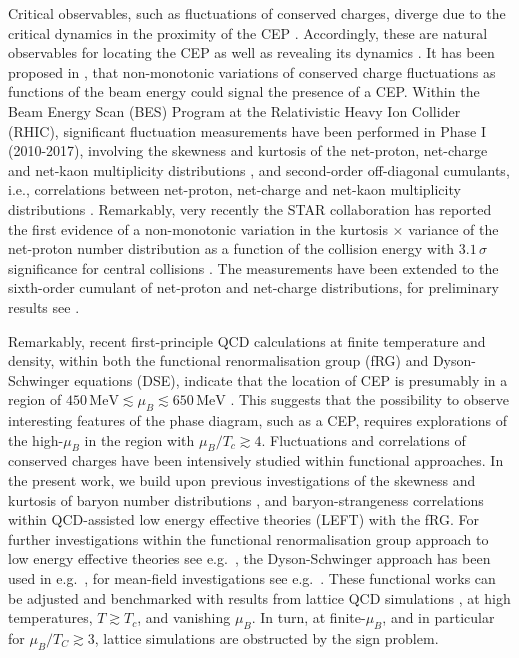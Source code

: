 \documentclass[%
reprint,
superscriptaddress,
showpacs,preprintnumbers,
amsmath,amssymb,
aps,
prd,
]{revtex4-1}
\begin{document}
Critical observables, such as fluctuations of conserved charges, diverge due to the critical dynamics in the proximity of the CEP \cite{Stephanov:2008qz}. Accordingly, these are natural observables for locating the CEP  as well as revealing its dynamics \cite{Luo:2017faz,Adam:2020unf}. It has been proposed in \cite{Stephanov:1999zu, Stephanov:2008qz, Stephanov:2011pb}, that non-monotonic variations of conserved charge fluctuations as functions of the beam energy could signal the presence of a CEP. Within the Beam Energy Scan (BES) Program at the Relativistic Heavy Ion Collider (RHIC), significant fluctuation measurements have been performed in Phase I (2010-2017), involving the skewness and kurtosis of the net-proton, net-charge and net-kaon multiplicity distributions  \cite{Adamczyk:2013dal,Adamczyk:2014fia,Luo:2015ewa,Adamczyk:2017wsl}, and second-order off-diagonal cumulants, i.e.,  correlations between net-proton, net-charge and net-kaon multiplicity distributions \cite{Adam:2019xmk}. Remarkably, very recently the STAR collaboration has reported the first evidence of a non-monotonic variation in the kurtosis $\times$ variance of the net-proton number distribution as a function of the collision energy with $3.1\,\sigma$ significance for central collisions \cite{Adam:2020unf}. The measurements have been extended to the sixth-order cumulant of net-proton and net-charge distributions, for preliminary results see  \cite{Nonaka:2020crv,Pandav:2020uzx}.
	
Remarkably, recent first-principle QCD calculations at finite temperature and density, within both the functional renormalisation group (fRG) and Dyson-Schwinger equations (DSE), indicate that the location of CEP is presumably in a region of $450\,\mathrm{MeV} \lesssim\mu_B\lesssim 650\,\mathrm{MeV}$ \cite{Fischer:2018sdj, Fu:2019hdw, Isserstedt:2019pgx, Gao:2020qsj, Gao:2020fbl}. This suggests that the possibility to observe interesting features of the phase diagram, such as a CEP, requires explorations of the high-$\mu_B$ in the region with $\mu_B/T_c\gtrsim 4$. Fluctuations and correlations of conserved charges have been intensively studied within functional approaches. In the present work, we build upon previous investigations  of the skewness and kurtosis of baryon number distributions \cite{Fu:2015naa, Fu:2015amv, Fu:2016tey}, and baryon-strangeness correlations \cite{Fu:2018qsk, Fu:2018swz} within QCD-assisted low energy effective theories (LEFT) with the fRG. For further  investigations within the functional renormalisation group approach to low energy effective theories see e.g.\  \cite{Skokov:2010wb, Skokov:2010uh, Morita:2014fda, Almasi:2017bhq}, the Dyson-Schwinger approach has been used in e.g.\  \cite{Xin:2014ela, Isserstedt:2019pgx}, for mean-field investigations see e.g.\ \cite{Fu:2009wy, Fu:2010ay, Karsch:2010hm, Schaefer:2011ex, Li:2018ygx}. These functional works can be adjusted and benchmarked with results from lattice QCD simulations  \cite{Bazavov:2012vg, Borsanyi:2013hza, Borsanyi:2014ewa, Bazavov:2017dus, Bazavov:2017tot, Borsanyi:2018grb, Bazavov:2020bjn}, at high temperatures, $T\gtrsim T_c$, and vanishing $\mu_B$. In turn, at finite-$\mu_B$, and in particular for $\mu_B/T_C\gtrsim 3$, lattice simulations are obstructed by the sign problem. 
	
\end{document}
